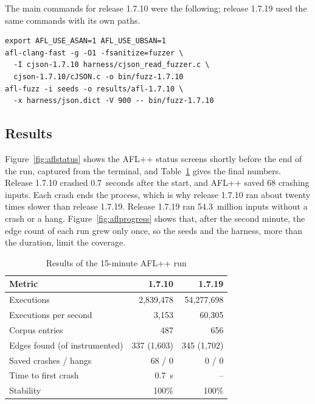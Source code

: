 The main commands for release 1.7.10 were the following; release 1.7.19
used the same commands with its own paths.

\noindent\begin{minipage}{\columnwidth}
\footnotesize
\begin{verbatim}
export AFL_USE_ASAN=1 AFL_USE_UBSAN=1
afl-clang-fast -g -O1 -fsanitize=fuzzer \
  -I cjson-1.7.10 harness/cjson_read_fuzzer.c \
  cjson-1.7.10/cJSON.c -o bin/fuzz-1.7.10
afl-fuzz -i seeds -o results/afl-1.7.10 \
  -x harness/json.dict -V 900 -- bin/fuzz-1.7.10
\end{verbatim}
\end{minipage}

\subsection{Results}

Figure~\ref{fig:aflstatus} shows the AFL++ status screens shortly before
the end of the run, captured from the terminal, and
Table~\ref{tab:aflrun} gives the final numbers. Release 1.7.10 crashed
0.7~seconds after the start, and AFL++ saved 68 crashing inputs. Each
crash ends the process, which is why release 1.7.10 ran about twenty
times slower than release 1.7.19. Release 1.7.19 ran 54.3~million
inputs without a crash or a hang. Figure~\ref{fig:aflprogress} shows
that, after the second minute, the edge count of each run grew only
once, so the seeds and the harness, more than the duration, limit the
coverage.

\begin{table}[!t]
\caption{Results of the 15-minute AFL++ run}
\label{tab:aflrun}
\centering
\footnotesize
\begin{tabular}{@{}lrr@{}}
\toprule
\textbf{Metric} & \textbf{1.7.10} & \textbf{1.7.19} \\
\midrule
Executions & 2{,}839{,}478 & 54{,}277{,}698 \\
Executions per second & 3{,}153 & 60{,}305 \\
Corpus entries & 487 & 656 \\
Edges found (of instrumented) & 337 (1{,}603) & 345 (1{,}702) \\
Saved crashes / hangs & 68 / 0 & 0 / 0 \\
Time to first crash & 0.7~s & -- \\
Stability & 100\% & 100\% \\
\bottomrule
\end{tabular}
\end{table}

